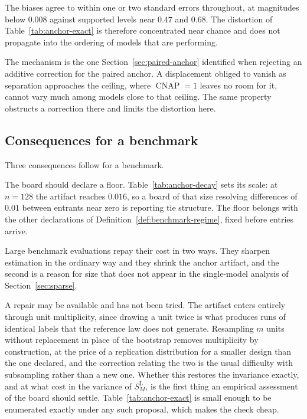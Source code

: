 \documentclass[11pt]{article}
\newcommand{\CNAP}{\operatorname{CNAP}}
\newcommand{\SLead}{S^{\mathrm{L}}}
\theoremstyle{remark}
\begin{document}
The biases agree to within one or two standard errors throughout, at magnitudes below $0.008$ against supported levels near $0.47$ and $0.68$. The distortion of Table~\ref{tab:anchor-exact} is therefore concentrated near chance and does not propagate into the ordering of models that are performing.

The mechanism is the one Section~\ref{sec:paired-anchor} identified when rejecting an additive correction for the paired anchor. A displacement obliged to vanish as separation approaches the ceiling, where $\CNAP=1$ leaves no room for it, cannot vary much among models close to that ceiling. The same property obstructs a correction there and limits the distortion here.

\subsection{Consequences for a benchmark}

Three consequences follow for a benchmark.

The board should declare a floor. Table~\ref{tab:anchor-decay} sets its scale: at $n=128$ the artifact reaches $0.016$, so a board of that size resolving differences of $0.01$ between entrants near zero is reporting tie structure. The floor belongs with the other declarations of Definition~\ref{def:benchmark-regime}, fixed before entries arrive.

Large benchmark evaluations repay their cost in two ways. They sharpen estimation in the ordinary way and they shrink the anchor artifact, and the second is a reason for size that does not appear in the single-model analysis of Section~\ref{sec:sparse}.

A repair may be available and has not been tried. The artifact enters entirely through unit multiplicity, since drawing a unit twice is what produces runs of identical labels that the reference law does not generate. Resampling $m$ units without replacement in place of the bootstrap removes multiplicity by construction, at the price of a replication distribution for a smaller design than the one declared, and the correction relating the two is the usual difficulty with subsampling rather than a new one. Whether this restores the invariance exactly, and at what cost in the variance of $\SLead_M$, is the first thing an empirical assessment of the board should settle. Table~\ref{tab:anchor-exact} is small enough to be enumerated exactly under any such proposal, which makes the check cheap.
\end{document}

